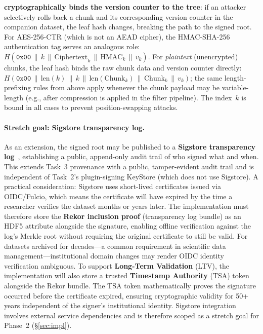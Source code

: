 \documentclass[11pt]{article}
\begin{document}
\textbf{cryptographically binds the version counter to the tree}: if an
attacker selectively rolls back a chunk and its corresponding version counter
in the companion dataset, the leaf hash changes, breaking the path to the
signed root. For AES-256-CTR (which is not an AEAD cipher), the HMAC-SHA-256
authentication tag serves an analogous role:
$H(\texttt{0x00} \,\|\, k \,\|\, \text{Ciphertext}_k \,\|\, \text{HMAC}_k \,\|\, v_k)$.
For \emph{plaintext} (unencrypted) chunks, the leaf hash binds the raw chunk
data and version counter directly:
$H(\texttt{0x00} \,\|\, \text{len}(k) \,\|\, k \,\|\, \text{len}(\text{Chunk}_k) \,\|\,
\text{Chunk}_k \,\|\, v_k)$;
the same length-prefixing rules from above apply whenever the chunk payload
may be variable-length (e.g., after compression is applied in the filter pipeline).
The index~$k$ is bound in all cases to prevent position-swapping attacks.

\paragraph{Stretch goal: Sigstore transparency log.}
As an extension, the signed root may be published to a
\textbf{Sigstore transparency log}~\cite{newman2022sigstore,
laurie2014certificate}, establishing a public, append-only audit trail of who
signed what and when. This extends Task~3 provenance with a public,
tamper-evident audit trail and is independent of Task~2's plugin-signing
KeyStore (which does not use Sigstore). A practical consideration: Sigstore uses short-lived certificates
issued via OIDC/Fulcio, which means the certificate will have expired by the
time a researcher verifies the dataset months or years later. The
implementation must therefore store the \textbf{Rekor inclusion proof}
(transparency log bundle) as an HDF5 attribute alongside the signature, enabling
offline verification against the log's Merkle root without requiring the
original certificate to still be valid. For datasets archived for decades---a
common requirement in scientific data management---institutional domain changes
may render OIDC identity verification ambiguous. To support
\textbf{Long-Term Validation} (LTV), the implementation will also store a
trusted \textbf{Timestamp Authority} (TSA) token~\cite{rfc3161} alongside the
Rekor bundle. The TSA token mathematically proves the signature occurred before
the certificate expired, ensuring cryptographic validity for 50+ years
independent of the signer's institutional identity. Sigstore integration
involves external service dependencies and is therefore scoped as a stretch goal
for Phase~2 (\S\ref{sec:impl}).
\end{document}

